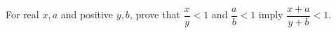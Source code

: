 For real $x,a$ and positive $y,b$, prove that $\dfrac{x}{y}<1$ and $\dfrac{a}{b}<1$ imply $\dfrac{x+a}{y+b}<1$.
